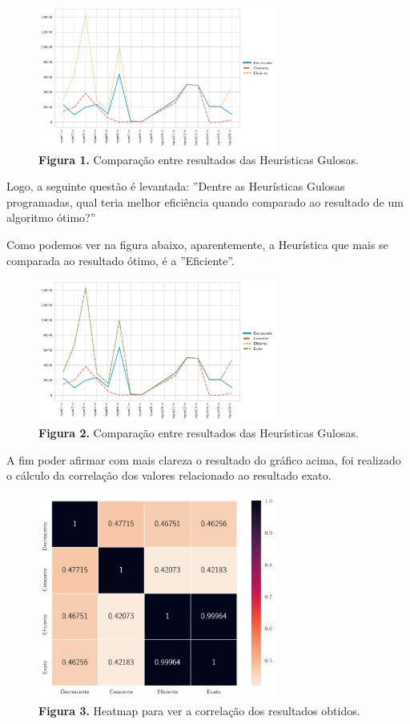 \documentclass[a4paper, 12pt]{article}
\begin{document}
\begin{figure}[h]
    \centering
    \includegraphics[width=0.7\textwidth]{../imgs/greedy_compare.pdf}
    \caption{\textbf{Figura 1.} Comparação entre resultados das Heurísticas Gulosas.}
    \label{greedy_compare}
\end{figure}

Logo, a seguinte questão é levantada: ''Dentre as Heurísticas Gulosas programadas, qual teria melhor eficiência quando comparado ao resultado de um algoritmo ótimo?''

Como podemos ver na figura abaixo, aparentemente, a Heurística que mais se comparada ao resultado ótimo, é a ''Eficiente''.
\begin{figure}[h]
    \centering
    \includegraphics[width=0.7\textwidth]{../imgs/exact_compare.pdf}
    \caption{\textbf{Figura 2.} Comparação entre resultados das Heurísticas Gulosas.}
    \label{exact_compare}
\end{figure}

A fim poder afirmar com mais clareza o resultado do gráfico acima, foi realizado o cálculo da correlação dos valores 
relacionado ao resultado exato.
\begin{figure}[h]
    \centering
    \includegraphics[width=0.7\textwidth]{../imgs/heatmap.pdf}
    \caption{\textbf{Figura 3.} Heatmap para ver a correlação dos resultados obtidos.}
    \label{heatmap}
\end{figure}
\end{document}
